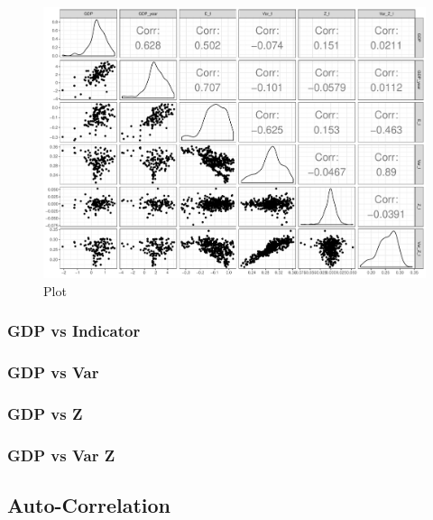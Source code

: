 \documentclass[12pt,a4paper,oneside]{book}
\begin{document}
\begin{figure}[H]
    \centering
    \includegraphics[scale=0.5]{Graphs/ggpairs2.pdf}
    \caption{Plot }
    \label{fig:ggpairs2}
\end{figure}

\subsubsection{GDP vs Indicator}

\subsubsection{GDP vs Var}

\subsubsection{GDP vs Z}

\subsubsection{GDP vs Var Z}




\subsection{Auto-Correlation}
\end{document}
